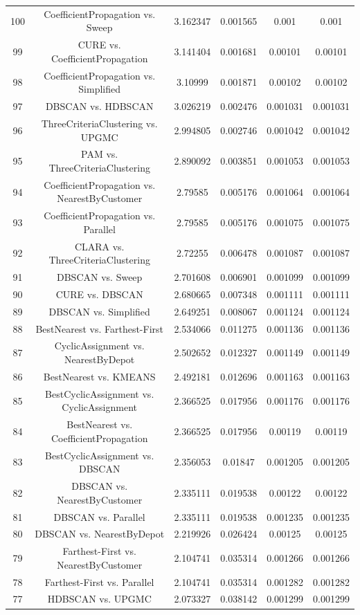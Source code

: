 \documentclass[a4paper,10pt]{article}
\begin{document}
\begin{landscape}
\begin{table}[!htp]
\begin{tabular}{cccccc}
100&CoefficientPropagation vs. Sweep&3.162347&0.001565&0.001&0.001\\
99&CURE vs. CoefficientPropagation&3.141404&0.001681&0.00101&0.00101\\
98&CoefficientPropagation vs. Simplified&3.10999&0.001871&0.00102&0.00102\\
97&DBSCAN vs. HDBSCAN&3.026219&0.002476&0.001031&0.001031\\
96&ThreeCriteriaClustering vs. UPGMC&2.994805&0.002746&0.001042&0.001042\\
95&PAM vs. ThreeCriteriaClustering&2.890092&0.003851&0.001053&0.001053\\
94&CoefficientPropagation vs. NearestByCustomer&2.79585&0.005176&0.001064&0.001064\\
93&CoefficientPropagation vs. Parallel&2.79585&0.005176&0.001075&0.001075\\
92&CLARA vs. ThreeCriteriaClustering&2.72255&0.006478&0.001087&0.001087\\
91&DBSCAN vs. Sweep&2.701608&0.006901&0.001099&0.001099\\
90&CURE vs. DBSCAN&2.680665&0.007348&0.001111&0.001111\\
89&DBSCAN vs. Simplified&2.649251&0.008067&0.001124&0.001124\\
88&BestNearest vs. Farthest-First&2.534066&0.011275&0.001136&0.001136\\
87&CyclicAssignment vs. NearestByDepot&2.502652&0.012327&0.001149&0.001149\\
86&BestNearest vs. KMEANS&2.492181&0.012696&0.001163&0.001163\\
85&BestCyclicAssignment vs. CyclicAssignment&2.366525&0.017956&0.001176&0.001176\\
84&BestNearest vs. CoefficientPropagation&2.366525&0.017956&0.00119&0.00119\\
83&BestCyclicAssignment vs. DBSCAN&2.356053&0.01847&0.001205&0.001205\\
82&DBSCAN vs. NearestByCustomer&2.335111&0.019538&0.00122&0.00122\\
81&DBSCAN vs. Parallel&2.335111&0.019538&0.001235&0.001235\\
80&DBSCAN vs. NearestByDepot&2.219926&0.026424&0.00125&0.00125\\
79&Farthest-First vs. NearestByCustomer&2.104741&0.035314&0.001266&0.001266\\
78&Farthest-First vs. Parallel&2.104741&0.035314&0.001282&0.001282\\
77&HDBSCAN vs. UPGMC&2.073327&0.038142&0.001299&0.001299\\

\end{tabular}
\end{table}
\end{landscape}
\end{document}
